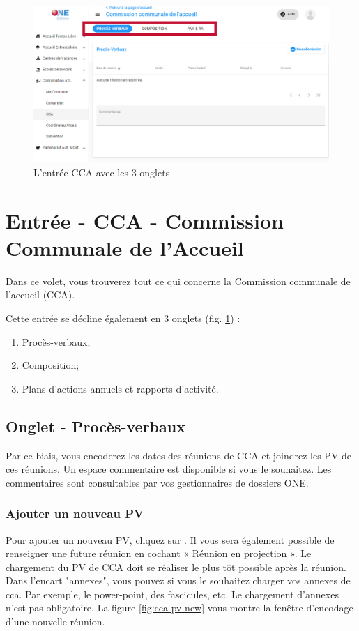 \begin{figure}
    \centering
    \includegraphics[width=0.5\linewidth,frame]{Images/catl/cca-onglets.png}
    \caption{L'entrée CCA avec les 3 onglets}
    \label{fig:cca-onglets}
\end{figure}

\section{Entrée - CCA - Commission Communale de l'Accueil}
Dans ce volet, vous trouverez tout ce qui concerne la Commission communale de l’accueil (CCA).

Cette entrée se décline également en 3 onglets (fig. \ref{fig:cca-onglets}) : 
\begin{enumerate}
    \item Procès-verbaux;
    \item Composition;
    \item Plans d'actions annuels et rapports d'activité.
\end{enumerate}


\subsection{Onglet - Procès-verbaux}
Par ce biais, vous encoderez les dates des réunions de CCA et joindrez les PV de ces réunions. Un espace commentaire est disponible si vous le souhaitez. Les commentaires sont consultables par vos gestionnaires de dossiers ONE. 

\subsubsection{Ajouter un nouveau PV}
Pour ajouter un nouveau PV, cliquez sur . Il vous sera également possible de renseigner une future réunion en cochant « Réunion en projection ». Le chargement du PV de CCA doit se réaliser le plus tôt possible après la réunion. Dans l'encart "annexes", vous pouvez si vous le souhaitez charger vos annexes de cca. Par exemple, le power-point, des fascicules, etc. Le chargement d'annexes n'est pas obligatoire. La figure \ref{fig:cca-pv-new} vous montre la fenêtre d'encodage d'une nouvelle réunion.


